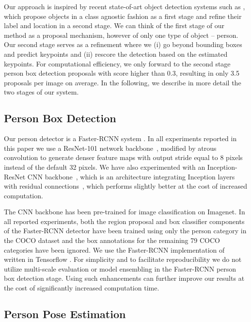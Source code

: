 \documentclass[10pt,twocolumn,letterpaper]{article}
\begin{document}
Our approach is inspired by recent state-of-art object detection systems such as \cite{girshick2014rich, szegedy2015going}, which propose objects in a class agnostic fashion as a first stage and refine their label and location in a second stage. We can think of the first stage of our method as a proposal mechanism, however of only one type of object -- person. Our second stage serves as a refinement where we (i) go beyond bounding boxes and predict keypoints and (ii) rescore the detection based on the estimated keypoints. For computational efficiency, we only forward to the second stage person box detection proposals with score higher than 0.3, resulting in only 3.5 proposals per image on average. In the following, we describe in more detail the two stages of our system.


\subsection{Person Box Detection}
\label{person_detection_model}

Our person detector is a Faster-RCNN system \cite{Ren2015}. In all experiments reported in this paper we use a ResNet-101 network backbone~\cite{He2016ResNets}, modified by atrous convolution \cite{chen2016deeplab, li2016r} to generate denser feature maps with output stride equal to 8 pixels instead of the default 32 pixels. We have also experimented with an Inception-ResNet CNN backbone~\cite{szegedy2016inception}, which is an architecture integrating Inception layers~\cite{szegedy2015going} with residual connections~\cite{He2016ResNets}, which performs slightly better at the cost of increased computation.

The CNN backbone has been pre-trained for image classification on Imagenet. In all reported experiments, both the region proposal and box classifier components of the Faster-RCNN detector have been trained using only the person category in the COCO dataset and the box annotations for the remaining 79 COCO categories have been ignored. We use the Faster-RCNN implementation of \cite{huang2016speed} written in Tensorflow \cite{tensorflow2015-whitepaper}. For simplicity and to facilitate reproducibility we do not utilize multi-scale evaluation or model ensembling in the Faster-RCNN person box detection stage. Using such enhancements can further improve our results at the cost of significantly increased computation time.

 \subsection{Person Pose Estimation}
\label{pose_estimation_model}
\end{document}
